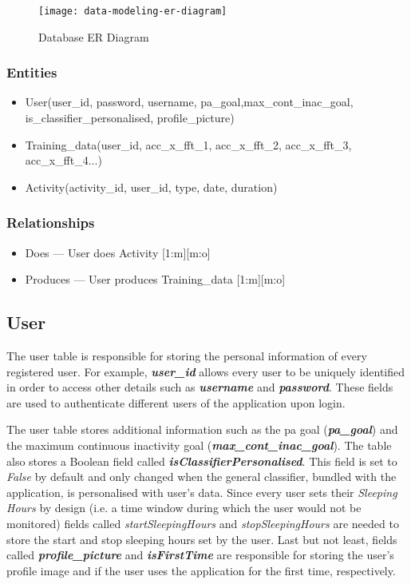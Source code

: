         \begin{figure}[ht]
            \centering
            \texttt{[image: data-modeling-er-diagram]}
            \caption{Database ER Diagram}
            \label{fig:data_modeling_er_diagram}
        \end{figure}
        
        \subsubsection{Entities}
        
        \begin{itemize}
            \item User(user\_id, password, username, pa\_goal,max\_cont\_inac\_goal, is\_classifier\_personalised, profile\_picture)
            \item Training\_data(user\_id, acc\_x\_fft\_1, acc\_x\_fft\_2, acc\_x\_fft\_3, acc\_x\_fft\_4...)
            \item Activity(activity\_id, user\_id, type, date, duration)
        \end{itemize}
        
        \subsubsection{Relationships}
        \begin{itemize}
        \item Does --- User does Activity [1:m][m:o]
        \item Produces --- User produces Training\_data [1:m][m:o]
        \end{itemize}
        
        \subsection{User}
        The user table is responsible for storing the personal information of every registered user. For example, \textbf{\textit{user\_id}} allows every user to be uniquely identified in order to access other details such as \textbf{\textit{username}} and \textbf{\textit{password}}. These fields are used to authenticate different users of the application upon login.
        
        The user table stores additional information such as the \gls{pa} goal (\textbf{\textit{pa\_goal}}) and the maximum continuous inactivity goal (\textbf{\textit{max\_cont\_inac\_goal}}). The table also stores a Boolean field called \textbf{\textit{isClassifierPersonalised}}. This field is set to \textit{False} by default and only changed when the general classifier, bundled with the application, is personalised with user's data. Since every user sets their \textit{Sleeping Hours} by design (i.e. a time window during which the user would not be monitored) fields called \textit{startSleepingHours} and \textit{stopSleepingHours} are needed to store the start and stop sleeping hours set by the user. Last but not least, fields called \textbf{\textit{profile\_picture}} and \textbf{\textit{isFirstTime}} are responsible for storing the user's profile image and if the user uses the application for the first time, respectively.
        
